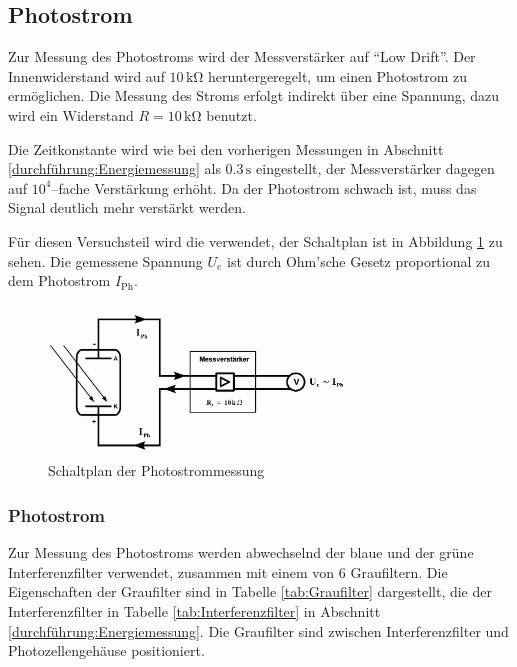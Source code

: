 \documentclass[12pt,a4paper]{scrartcl}
\numberwithin{equation}{section} %
\begin{document}
\subsection{Photostrom}

Zur Messung des Photostroms wird der Messverstärker auf ``Low Drift''. Der Innenwiderstand wird auf $10\mathrm{\,k\Omega}$ heruntergeregelt, um einen Photostrom zu ermöglichen. Die Messung des Stroms erfolgt indirekt über eine Spannung, dazu wird ein Widerstand $R=10\mathrm{\,k\Omega}$ benutzt.

Die Zeitkonstante wird wie bei den vorherigen Messungen in Abschnitt \ref{durchführung:Energiemessung} als $0.3\mathrm{\,s}$ eingestellt, der Messverstärker dagegen auf $10^4$--fache Verstärkung erhöht. Da der Photostrom schwach ist, muss das Signal deutlich mehr verstärkt werden.

Für diesen Versuchsteil wird die  verwendet, der Schaltplan ist in Abbildung \ref{fig:Schaltplan Photostrom} zu sehen. Die gemessene Spannung $U_e$ ist durch Ohm'sche Gesetz proportional zu dem Photostrom $I_\mathrm{Ph}$.

\begin{figure}[h!]
	\centering
	\includegraphics[width=0.7\textwidth]{../media/B1.4/Schaltplan_Photostrom.jpg}
	\caption{Schaltplan der Photostrommessung}
	\label{fig:Schaltplan Photostrom}
\end{figure}

\subsubsection{Photostrom}
Zur Messung des Photostroms werden abwechselnd der blaue und der grüne Interferenzfilter verwendet, zusammen mit einem von $6$ Graufiltern. Die Eigenschaften der Graufilter sind in Tabelle \ref{tab:Graufilter} dargestellt, die der Interferenzfilter in Tabelle \ref{tab:Interferenzfilter} in Abschnitt \ref{durchführung:Energiemessung}. Die Graufilter sind zwischen Interferenzfilter und Photozellengehäuse positioniert.
\end{document}
